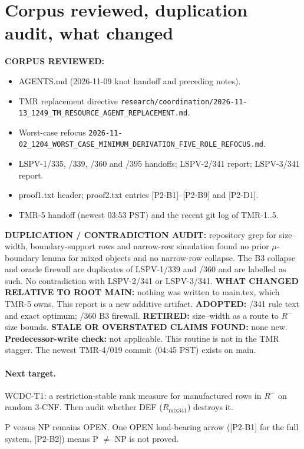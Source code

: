 \documentclass[11pt]{article}
\begin{document}
\section{Corpus reviewed, duplication audit, what changed}
\textbf{CORPUS REVIEWED:}
\begin{itemize}
\item AGENTS.md (2026-11-09 knot handoff and preceding notes).
\item TMR replacement directive \texttt{research/coordination/2026-11-13\_1249\_TM\_RESOURCE\_AGENT\_REPLACEMENT.md}.
\item Worst-case refocus \texttt{2026-11-02\_1204\_WORST\_CASE\_MINIMUM\_DERIVATION\_FIVE\_ROLE\_REFOCUS.md}.
\item LSPV-1/335, /339, /360 and /395 handoffs; LSPV-2/341 report; LSPV-3/341 report.
\item proof1.txt header; proof2.txt entries [P2-B1]--[P2-B9] and [P2-D1].
\item TMR-5 handoff (newest 03:53 PST) and the recent git log of TMR-1..5.
\end{itemize}
\textbf{DUPLICATION / CONTRADICTION AUDIT:} repository grep for size--width, boundary-support rows and narrow-row simulation found no prior $\mu$-boundary lemma for mixed objects and no narrow-row collapse. The B3 collapse and oracle firewall are duplicates of LSPV-1/339 and /360 and are labelled as such. No contradiction with LSPV-2/341 or LSPV-3/341.
\textbf{WHAT CHANGED RELATIVE TO ROOT MAIN:} nothing was written to main.tex, which TMR-5 owns. This report is a new additive artifact.
\textbf{ADOPTED:} /341 rule text and exact optimum; /360 B3 firewall. \textbf{RETIRED:} size--width as a route to $R^-$ size bounds.
\textbf{STALE OR OVERSTATED CLAIMS FOUND:} none new.
\textbf{Predecessor-write check:} not applicable. This routine is not in the TMR stagger. The newest TMR-4/019 commit (04:45 PST) exists on main.

\paragraph{Next target.} WCDC-T1: a restriction-stable rank measure for manufactured rows in $R^-$ on random 3-CNF. Then audit whether DEF ($R_{\mathrm{mix341}}$) destroys it.

\medskip\noindent P versus NP remains OPEN. One OPEN load-bearing arrow ([P2-B1] for the full system, [P2-B2]) means P $\ne$ NP is not proved.
\end{document}
